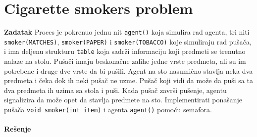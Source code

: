 \clearpage
\section{Cigarette smokers problem}
\textbf{\large Zadatak} Proces je pokrenuo jednu nit \texttt{agent()} koja simulira rad agenta, tri niti \texttt{smoker(MATCHES)}, \texttt{smoker(PAPER)} i \texttt{smoker(TOBACCO)} koje simuliraju rad pu\v{s}a\v{c}a, i ima deljenu strukturu \texttt{table} koja sadr\v{z}i informaciju koji predmeti se trenutno nalaze na stolu. Pu\v{s}a\v{c}i imaju beskona\v{c}ne zalihe jedne vrste predmeta, ali su im potrebene i druge dve vrste da bi pu\v{s}ili. Agent na sto nasumi\v{c}no stavlja neka dva  predmeta i \v{c}eka dok ih neki pu\v{s}a\v{c} ne uzme. Pu\v{s}a\v{c} koji vidi da mo\v{z}e da pu\v{s}i sa ta dva predmeta ih uzima sa stola i pu\v{s}i. Kada pu\v{s}a\v{c} zavr\v{s}i pu\v{s}enje, agentu signalizira da mo\v{z}e opet da stavlja predmete na sto. Implementirati pona\v{s}anje pu\v{s}a\v{c}a \texttt{void smoker(int item)} i agenta \texttt{agent()} pomo\'{c}u semafora.
\\\\
\textbf{\large Re\v{s}enje}

